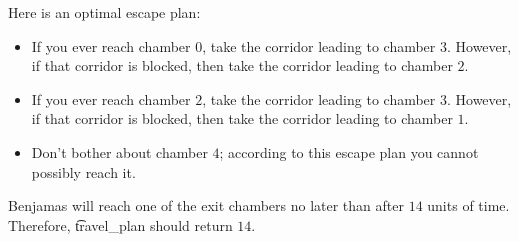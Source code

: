 Here is an optimal escape plan:
\begin{itemize}
\item If you ever reach chamber $0$, take the corridor leading to chamber $3$. However, if that corridor is blocked, then take the corridor leading to chamber $2$.
\item If you ever reach chamber $2$, take the corridor leading to chamber $3$. However, if that corridor is blocked, then take the corridor leading to chamber $1$.
\item Don't bother about chamber $4$; according to this escape plan you cannot possibly reach it.
\end{itemize}
Benjamas will reach one of the exit chambers no later than after $14$ units of time. Therefore,
\t{travel\_plan} should return $14$.
